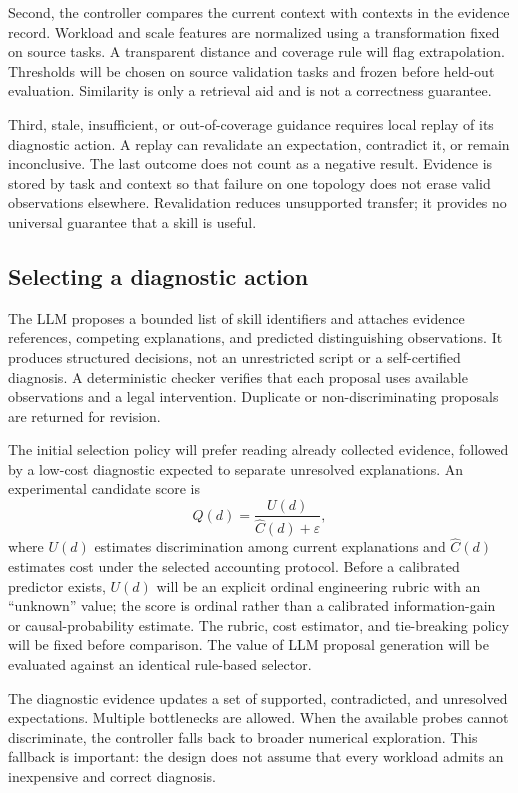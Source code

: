 \documentclass[11pt,a4paper]{article}
\begin{document}
Second, the controller compares the current context with contexts in the evidence record. Workload and scale features are normalized using a transformation fixed on source tasks. A transparent distance and coverage rule will flag extrapolation. Thresholds will be chosen on source validation tasks and frozen before held-out evaluation. Similarity is only a retrieval aid and is not a correctness guarantee.

Third, stale, insufficient, or out-of-coverage guidance requires local replay of its diagnostic action. A replay can revalidate an expectation, contradict it, or remain inconclusive. The last outcome does not count as a negative result. Evidence is stored by task and context so that failure on one topology does not erase valid observations elsewhere. Revalidation reduces unsupported transfer; it provides no universal guarantee that a skill is useful.

\subsection{Selecting a diagnostic action}
The LLM proposes a bounded list of skill identifiers and attaches evidence references, competing explanations, and predicted distinguishing observations. It produces structured decisions, not an unrestricted script or a self-certified diagnosis. A deterministic checker verifies that each proposal uses available observations and a legal intervention. Duplicate or non-discriminating proposals are returned for revision.

The initial selection policy will prefer reading already collected evidence, followed by a low-cost diagnostic expected to separate unresolved explanations. An experimental candidate score is
\begin{equation}
 Q(d)=\frac{U(d)}{\widehat C(d)+\varepsilon},
\end{equation}
where $U(d)$ estimates discrimination among current explanations and $\widehat C(d)$ estimates cost under the selected accounting protocol. Before a calibrated predictor exists, $U(d)$ will be an explicit ordinal engineering rubric with an ``unknown'' value; the score is ordinal rather than a calibrated information-gain or causal-probability estimate. The rubric, cost estimator, and tie-breaking policy will be fixed before comparison. The value of LLM proposal generation will be evaluated against an identical rule-based selector.

The diagnostic evidence updates a set of supported, contradicted, and unresolved expectations. Multiple bottlenecks are allowed. When the available probes cannot discriminate, the controller falls back to broader numerical exploration. This fallback is important: the design does not assume that every workload admits an inexpensive and correct diagnosis.
\end{document}
